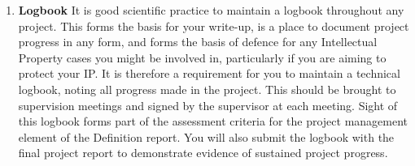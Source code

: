 \begin{enumerate}
    \item \textbf{Logbook}
    \subitem  It is good scientific practice to maintain a logbook throughout any project. This forms the basis for your write-up, is a place to document project progress in any form, and forms the basis of defence for any Intellectual Property cases you might be involved in, particularly if you are aiming to protect your IP. It is therefore a requirement for you to maintain a technical logbook, noting all progress made in the project. This should be brought to supervision meetings and signed by the supervisor at each meeting. Sight of this logbook forms part of the assessment criteria for the project management element of the Definition report. You will also submit the logbook with the final project report to demonstrate evidence of sustained project progress.
\end{enumerate}
